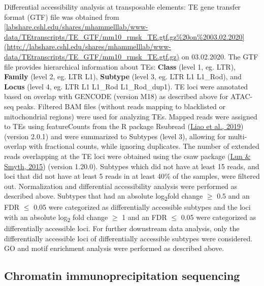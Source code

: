 \documentclass[12pt,twoside]{reedthesis}
\begin{document}
Differential accessibility analysis at transposable elements: TE gene
transfer format (GTF) file was obtained from
\href{http://labshare.cshl.edu/shares/mhammelllab/www-data/TEtranscripts/TE_GTF/mm10_rmsk_TE.gtf.gz\%20on\%2003.02.2020}{{[}labshare.cshl.edu/shares/mhammelllab/www-data/TEtranscripts/TE\_GTF/mm10\_rmsk\_TE.gtf.gz\%20on\%2003.02.2020{]}(http://labshare.cshl.edu/shares/mhammelllab/www-data/TEtranscripts/TE\_GTF/mm10\_rmsk\_TE.gtf.gz)}
on 03.02.2020. The GTF file provides hierarchical information about TEs:
\textbf{Class} (level 1, eg. LTR), \textbf{Family} (level 2, eg. LTR L1),
\textbf{Subtype} (level 3, eg. LTR L1 L1\_Rod), and \textbf{Locus} (level 4, eg.
LTR L1 L1\_Rod L1\_Rod\_dup1). TE loci were annotated based on overlap with
GENCODE (version M18) as described above for ATAC-seq peaks. Filtered
BAM files (without reads mapping to blacklisted or mitochondrial
regions) were used for analyzing TEs. Mapped reads were assigned to TEs
using featureCounts from the R package Rsubread (\protect\hyperlink{ref-liao2019}{Liao et al., 2019}) (version
2.0.1) and were summarized to Subtypes (level 3), allowing for
multi-overlap with fractional counts, while ignoring duplicates. The
number of extended reads overlapping at the TE loci were obtained using
the csaw package (\protect\hyperlink{ref-lun2015}{Lun \& Smyth, 2015}) (version 1.20.0). Subtypes which did not
have at least 15 reads, and loci that did not have at least 5 reads in
at least 40\% of the samples, were filtered out. Normalization and
differential accessibility analysis were performed as described above.
Subtypes that had an absolute log\textsubscript{2}fold change \(\geq\) 0.5 and an FDR
\(\leq\) 0.05 were categorized as differentially accessible subtypes and
the loci with an absolute log\textsubscript{2} fold change \(\geq\) 1 and an FDR \(\leq\)
0.05 were categorized as differentially accessible loci. For further
downstream data analysis, only the differentially accessible loci of
differentially accessible subtypes were considered. GO and motif
enrichment analysis were performed as described above.

\hypertarget{chromatin-immunoprecipitation-sequencing}{%
\subsection{Chromatin immunoprecipitation sequencing}\label{chromatin-immunoprecipitation-sequencing}}
\end{document}
